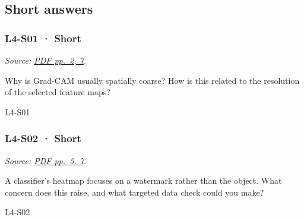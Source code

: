 \subsection{Short answers}\label{short-answers-18}

\noindent\begin{minipage}{\linewidth}

\subsubsection{L4-S01 · Short}\label{l4-s01-short}

\emph{Source:
\href{../Lab\%20Sessions/Lab4/manolo_presentation.pdf\#page=2}{PDF
pp.~2, 7}.}

Why is Grad-CAM usually spatially coarse? How is this related to the
resolution of the selected feature maps?

\begin{solution}[20mm]{L4-S01}

\end{solution}
\end{minipage}\par\medskip

\noindent\begin{minipage}{\linewidth}

\subsubsection{L4-S02 · Short}\label{l4-s02-short}

\emph{Source:
\href{../Lab\%20Sessions/Lab4/manolo_presentation.pdf\#page=5}{PDF
pp.~5, 7}.}

A classifier's heatmap focuses on a watermark rather than the object.
What concern does this raise, and what targeted data check could you
make?

\begin{solution}[20mm]{L4-S02}

\end{solution}
\end{minipage}\par\medskip

